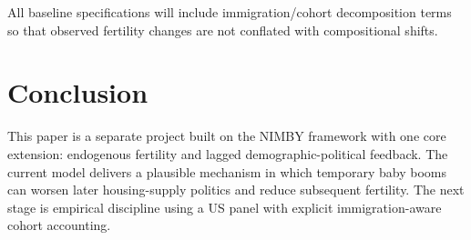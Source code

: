 \documentclass[11pt]{article}
\begin{document}
All baseline specifications will include immigration/cohort decomposition terms so that observed
fertility changes are not conflated with compositional shifts.

\section{Conclusion}

This paper is a separate project built on the NIMBY framework with one core extension:
endogenous fertility and lagged demographic-political feedback. The current model delivers
a plausible mechanism in which temporary baby booms can worsen later housing-supply politics
and reduce subsequent fertility. The next stage is empirical discipline using a US panel with
explicit immigration-aware cohort accounting.
\end{document}
